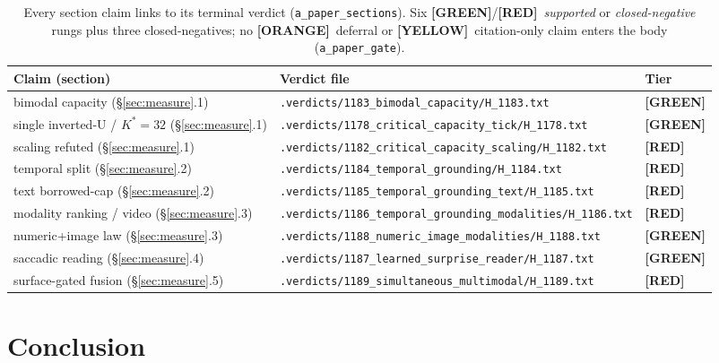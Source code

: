 \documentclass[11pt,a4paper]{article}
\providecommand{\tierGreen}{\textbf{[GREEN]}}
\providecommand{\tierYellow}{\textbf{[YELLOW]}}
\providecommand{\tierOrange}{\textbf{[ORANGE]}}
\providecommand{\tierRed}{\textbf{[RED]}}
\newcommand{\Kstar}{K^{\!*}}
\begin{document}
\begin{table}[h]
\centering\small
\begin{tabular}{@{}l l l@{}}
\toprule
\textbf{Claim (section)} & \textbf{Verdict file} & \textbf{Tier} \\
\midrule
bimodal capacity (\S\ref{sec:measure}.1)         & \texttt{.verdicts/1183\_bimodal\_capacity/H\_1183.txt} & \tierGreen \\
single inverted-U / $\Kstar{=}32$ (\S\ref{sec:measure}.1) & \texttt{.verdicts/1178\_critical\_capacity\_tick/H\_1178.txt} & \tierGreen \\
scaling refuted (\S\ref{sec:measure}.1)          & \texttt{.verdicts/1182\_critical\_capacity\_scaling/H\_1182.txt} & \tierRed \\
temporal split (\S\ref{sec:measure}.2)           & \texttt{.verdicts/1184\_temporal\_grounding/H\_1184.txt} & \tierRed \\
text borrowed-cap (\S\ref{sec:measure}.2)        & \texttt{.verdicts/1185\_temporal\_grounding\_text/H\_1185.txt} & \tierRed \\
modality ranking / video (\S\ref{sec:measure}.3) & \texttt{.verdicts/1186\_temporal\_grounding\_modalities/H\_1186.txt} & \tierRed \\
numeric+image law (\S\ref{sec:measure}.3)        & \texttt{.verdicts/1188\_numeric\_image\_modalities/H\_1188.txt} & \tierGreen \\
saccadic reading (\S\ref{sec:measure}.4)         & \texttt{.verdicts/1187\_learned\_surprise\_reader/H\_1187.txt} & \tierGreen \\
surface-gated fusion (\S\ref{sec:measure}.5)     & \texttt{.verdicts/1189\_simultaneous\_multimodal/H\_1189.txt} & \tierRed \\
\bottomrule
\end{tabular}
\caption{Every section claim links to its terminal verdict
(\texttt{a\_paper\_sections}). Six \tierGreen/\tierRed\ \emph{supported} or
\emph{closed-negative} rungs plus three closed-negatives; no \tierOrange\ deferral
or \tierYellow\ citation-only claim enters the body (\texttt{a\_paper\_gate}).}
\label{tab:verdicts}
\end{table}

\section{Conclusion}
\label{sec:conclusion}
\end{document}
